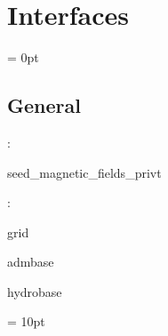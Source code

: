
\section{Interfaces} 


\parskip = 0pt

\vspace{3mm} \subsection*{General}

: 

seed\_magnetic\_fields\_privt
\vspace{2mm}

: 

grid

admbase

hydrobase
\vspace{2mm}

\vspace{5mm}\parskip = 10pt 
